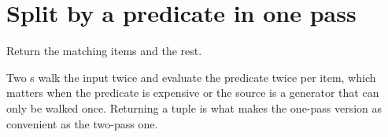 \section{Split by a predicate in one pass}
\label{sec:appD-partition}

\noindent
Return the matching items and the rest.



\noindent
Two s walk the input twice and evaluate the predicate twice per item, which matters when the predicate is expensive or the source is a generator that can only be walked once. Returning a tuple is what makes the one-pass version as convenient as the two-pass one.

